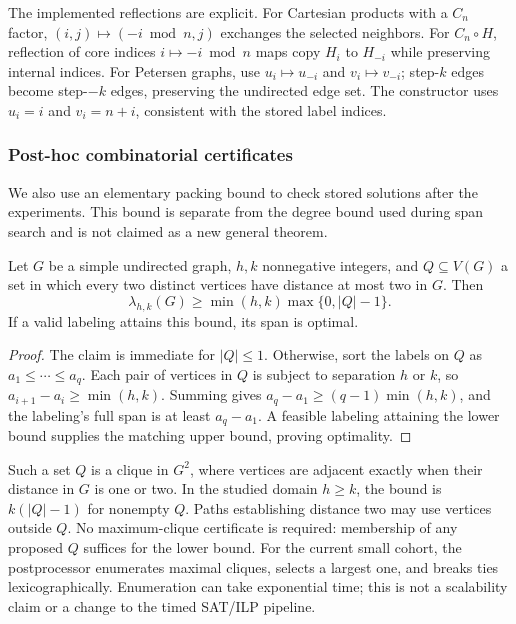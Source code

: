 The implemented reflections are explicit. For Cartesian products with a
$C_n$ factor, $(i,j)\mapsto(-i\bmod n,j)$ exchanges the selected neighbors.
For $C_n\circ H$, reflection of core indices $i\mapsto-i\bmod n$ maps
copy $H_i$ to $H_{-i}$ while preserving internal indices. For Petersen graphs,
use $u_i\mapsto u_{-i}$ and $v_i\mapsto v_{-i}$; step-$k$ edges become
step-$-k$ edges, preserving the undirected edge set. The constructor uses
$u_i=i$ and $v_i=n+i$, consistent with the stored label indices.

\subsubsection{Post-hoc combinatorial certificates}
\label{sec:clique-method}
We also use an elementary packing bound to check stored solutions after
the experiments. This bound is separate from the degree bound used during
span search and is not claimed as a new general theorem.

\begin{proposition}
\label{prop:square-clique}
Let $G$ be a simple undirected graph, $h,k$ nonnegative integers, and
$Q\subseteq V(G)$ a set in which every two distinct vertices have distance
at most two in $G$. Then
\[
 \lambda_{h,k}(G)\geq \min(h,k)\max\{0,|Q|-1\}.
\]
If a valid labeling attains this bound, its span is optimal.
\end{proposition}
\begin{proof}
The claim is immediate for $|Q|\leq1$. Otherwise, sort the labels on $Q$
as $a_1\leq\cdots\leq a_q$. Each pair of vertices in $Q$ is subject to
separation $h$ or $k$, so $a_{i+1}-a_i\geq\min(h,k)$. Summing gives
$a_q-a_1\geq(q-1)\min(h,k)$, and the labeling's full span is at least
$a_q-a_1$. A feasible labeling attaining the lower bound supplies the
matching upper bound, proving optimality.
\end{proof}

Such a set $Q$ is a clique in $G^2$, where vertices are adjacent exactly
when their distance in $G$ is one or two. In the studied domain $h\geq k$,
the bound is $k(|Q|-1)$ for nonempty $Q$. Paths establishing distance two
may use vertices outside $Q$. No maximum-clique certificate is required:
membership of any proposed $Q$ suffices for the lower bound.
For the current small cohort, the postprocessor enumerates maximal cliques,
selects a largest one, and breaks ties lexicographically. Enumeration can
take exponential time; this is not a scalability claim or a change to
the timed SAT/ILP pipeline.

